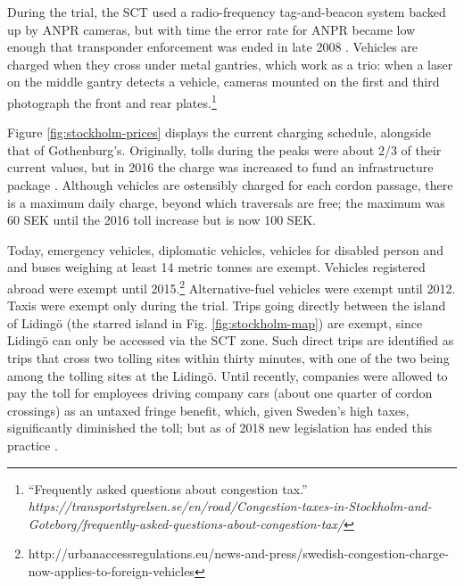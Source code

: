 During the trial, the SCT used a radio-frequency tag-and-beacon system backed up by ANPR cameras, but with time the error rate for ANPR became low enough that transponder enforcement was ended in late 2008 \citep[p. 841]{Hamilton2011}. Vehicles are charged when they cross under metal gantries, which work as a trio: when a laser on the middle gantry detects a vehicle, cameras mounted on the first and third photograph the front and rear plates.\footnote{``Frequently asked questions about congestion tax.'' \emph{https://transportstyrelsen.se/en/road/Congestion-taxes-in-Stockholm-and-Goteborg/frequently-asked-questions-about-congestion-tax/}}

Figure \ref{fig:stockholm-prices} displays the current charging schedule, alongside that of Gothenburg's. Originally, tolls during the peaks were about 2/3 of their current values, but in 2016 the charge was increased to fund an infrastructure package \citep{Borjesson2018}. Although vehicles are ostensibly charged for each cordon passage, there is a maximum daily charge, beyond which traversals are free; the maximum was 60 SEK until the 2016 toll increase but is now 100 SEK. 

Today, emergency vehicles, diplomatic vehicles, vehicles for disabled person and and buses weighing at least 14 metric tonnes are exempt. Vehicles registered abroad were exempt until 2015.\footnote{http://urbanaccessregulations.eu/news-and-press/swedish-congestion-charge-now-applies-to-foreign-vehicles } Alternative-fuel vehicles were exempt until 2012. Taxis were exempt only during the trial. Trips going directly between the island of Liding\"o (the starred island in Fig. \ref{fig:stockholm-map}) are exempt, since Liding\"o can only be accessed via the SCT zone. Such direct trips are identified as trips that cross two tolling sites within thirty minutes, with one of the two being among the tolling sites at the Liding\"o. Until recently, companies were allowed to pay the toll for employees driving company cars (about one quarter of cordon crossings) as an untaxed fringe benefit, which, given Sweden's high taxes, significantly diminished the toll; but as of 2018 new legislation has ended this practice \citep[Sec. 2.2]{Borjesson2018}.

